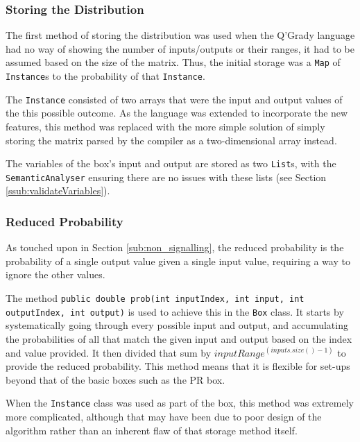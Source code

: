 \documentclass[report.tex]{subfiles}
\begin{document}
\subsubsection{Storing the Distribution} %
\label{ssub:storing_the_distribution}
The first method of storing the distribution was used when the Q'Grady language
had no way of showing the number of inputs/outputs or their ranges, it had to be
assumed based on the size of the matrix. Thus, the initial storage was a
\texttt{Map} of \texttt{Instance}s to the probability of that \texttt{Instance}.

The \texttt{Instance} consisted of two arrays that were the input and output
values of the this possible outcome. As the language was extended to incorporate
the new features, this method was replaced with the more simple solution of
simply storing the matrix parsed by the compiler as a two-dimensional array
instead.

The variables of the box's input and output are stored as two \texttt{List}s,
with the \texttt{SemanticAnalyser} ensuring there are no issues with these
lists (see Section \ref{ssub:validateVariables}).

\subsubsection{Reduced Probability} %
\label{ssub:reduced_probability}
As touched upon in Section \ref{sub:non_signalling}, the reduced probability is
the probability of a single output value given a single input value, requiring
a way to ignore the other values.

 

The method \texttt{public double prob(int inputIndex, int input,
int outputIndex, int output)} is used to achieve this in the \texttt{Box} class.
It starts by systematically going through every possible input and output, and
accumulating the probabilities of all that match the given input and output
based on the index and value provided. It then divided that sum by
\(inputRange ^ (inputs.size() - 1)\) to provide the reduced probability. This
method means that it is flexible for set-ups beyond that of the basic boxes such
as the PR box.

When the \texttt{Instance} class was used as part of the box, this method was
extremely more complicated, although that may have been due to poor design of
the algorithm rather than an inherent flaw of that storage method itself.
\end{document}
